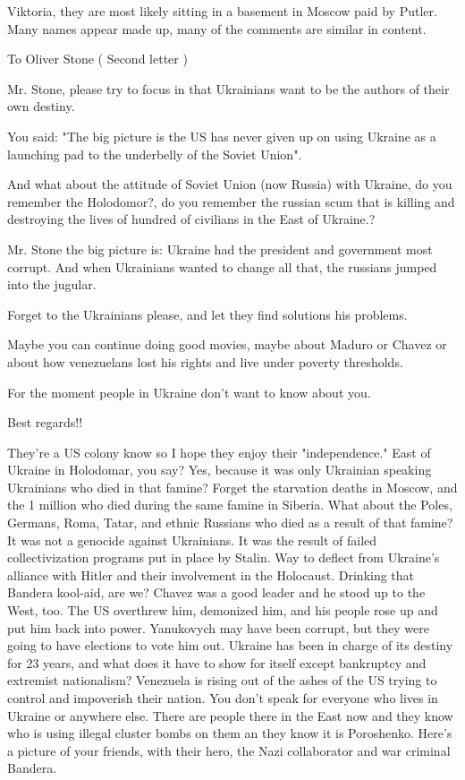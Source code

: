 \begin{itemize}
\begin{itemize}
Viktoria, they are most likely sitting in a basement in Moscow paid by Putler.
Many names appear made up, many of the comments are similar in content.

\end{itemize} %


To Oliver Stone ( Second letter )

Mr. Stone, please try to focus in that Ukrainians want to be the authors of
their own destiny.

You said: "The big picture is the US has never given up on using Ukraine as a
launching pad to the underbelly of the Soviet Union".

And what about the attitude of Soviet Union (now Russia) with Ukraine, do you
remember the Holodomor?, do you remember the russian scum that is killing and
destroying the lives of hundred of civilians in the East of Ukraine.?

Mr. Stone the big picture is: Ukraine had the president and government most
corrupt. And when Ukrainians wanted to change all that, the russians jumped
into the jugular.

Forget to the Ukrainians please, and let they find solutions his problems.

Maybe you can continue doing good movies, maybe about Maduro or Chavez or about
how venezuelans lost his rights and live under poverty thresholds.

For the moment people in Ukraine don't want to know about you.

Best regards!!

\begin{itemize} %

They're a US colony know so I hope they enjoy their "independence." East of
Ukraine in Holodomar, you say? Yes, because it was only Ukrainian speaking
Ukrainians who died in that famine? Forget the starvation deaths in Moscow, and
the 1 million who died during the same famine in Siberia. What about the Poles,
Germans, Roma, Tatar, and ethnic Russians who died as a result of that famine?
It was not a genocide against Ukrainians. It was the result of failed
collectivization programs put in place by Stalin. Way to deflect from Ukraine's
alliance with Hitler and their involvement in the Holocaust. Drinking that
Bandera kool-aid, are we? Chavez was a good leader and he stood up to the West,
too. The US overthrew him, demonized him, and his people rose up and put him
back into power. Yanukovych may have been corrupt, but they were going to have
elections to vote him out. Ukraine has been in charge of its destiny for 23
years, and what does it have to show for itself except bankruptcy and extremist
nationalism? Venezuela is rising out of the ashes of the US trying to control
and impoverish their nation. You don't speak for everyone who lives in Ukraine
or anywhere else. There are people there in the East now and they know who is
using illegal cluster bombs on them an they know it is Poroshenko. Here's a
picture of your friends, with their hero, the Nazi collaborator and war
criminal Bandera.


\end{itemize}
\end{itemize}
